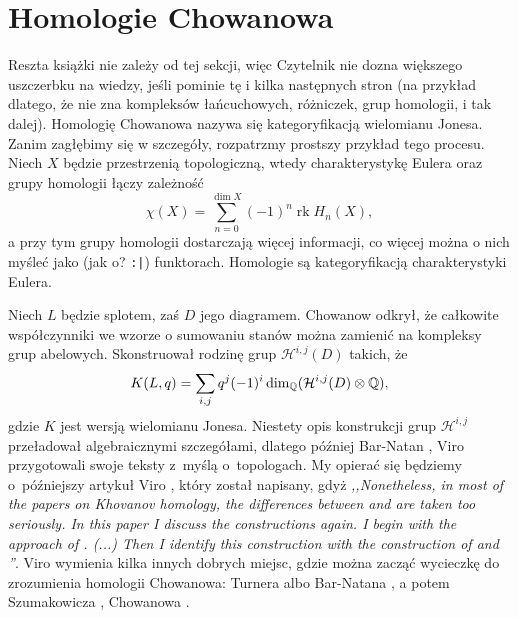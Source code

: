 
\section{Homologie Chowanowa}

Reszta książki nie zależy od tej sekcji, więc Czytelnik nie dozna większego uszczerbku na wiedzy, jeśli pominie tę i kilka następnych stron (na przykład dlatego, że nie zna kompleksów łańcuchowych, różniczek, grup homologii, i tak dalej).
Homologię Chowanowa nazywa się kategoryfikacją wielomianu Jonesa.
Zanim zagłębimy się w szczegóły, rozpatrzmy prostszy przykład tego procesu.
Niech $X$ będzie przestrzenią topologiczną, wtedy charakterystykę Eulera oraz grupy homologii łączy zależność
\begin{equation}
    \chi(X) = \sum_{n = 0}^{\dim X} (-1)^n \operatorname{rk} H_n(X),
\end{equation}
a przy tym grupy homologii dostarczają więcej informacji, co więcej można o nich myśleć jako (jak o? \texttt{:|}) funktorach.
Homologie są kategoryfikacją charakterystyki Eulera.

Niech $L$ będzie splotem, zaś $D$ jego diagramem.
Chowanow \cite{khovanov2000} odkrył, że całkowite współczynniki we wzorze o sumowaniu stanów można zamienić na kompleksy grup abelowych.
Skonstruował rodzinę grup $\mathcal H^{i, j}(D)$ takich, że
\begin{equation}
    K(L, q) = \sum_{i, j} q^j (-1)^i \dim_\mathbb Q (\mathcal H^{i, j}(D) \otimes \mathbb Q),
\end{equation}
gdzie $K$ jest wersją wielomianu Jonesa.
Niestety opis konstrukcji grup $\mathcal H^{i, j}$ przeładował algebraicznymi szczegółami, dlatego później Bar-Natan \cite{barnatan2002}, Viro \cite{viro2002} przygotowali swoje teksty z~myślą o~topologach.
%
%
My opierać się będziemy o~późniejszy artykuł Viro \cite{viro2004}, który został napisany, gdyż \emph{,,Nonetheless, in most of the papers on Khovanov homology, the differences between \cite{barnatan2002} and \cite{viro2002} are taken too seriously. In this paper I discuss the constructions again. I begin with the approach of \cite{viro2002}. (...) Then I identify this construction with the construction of \cite{barnatan2002} and \cite{khovanov2000}''}.
Viro \cite{viro2004} wymienia kilka innych dobrych miejsc, gdzie można zacząć wycieczkę do zrozumienia homologii Chowanowa: Turnera \cite{turner2017} albo Bar-Natana \cite{barnatan2002}, a potem Szumakowicza \cite{shumakovitch2012}, Chowanowa \cite{khovanov2000}.
%
%
%
%

